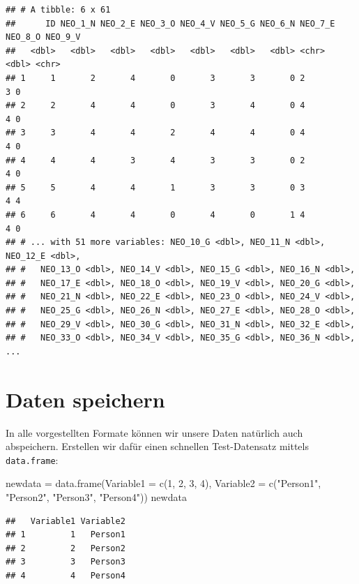 \documentclass[
]{book}
\newenvironment{Shaded}{\begin{snugshade}}{\end{snugshade}}
\newcommand{\AttributeTok}[1]{\textcolor[rgb]{0.77,0.63,0.00}{#1}}
\newcommand{\DecValTok}[1]{\textcolor[rgb]{0.00,0.00,0.81}{#1}}
\newcommand{\FunctionTok}[1]{\textcolor[rgb]{0.00,0.00,0.00}{#1}}
\newcommand{\NormalTok}[1]{#1}
\newcommand{\OtherTok}[1]{\textcolor[rgb]{0.56,0.35,0.01}{#1}}
\newcommand{\StringTok}[1]{\textcolor[rgb]{0.31,0.60,0.02}{#1}}
\begin{document}
\begin{verbatim}
## # A tibble: 6 x 61
##      ID NEO_1_N NEO_2_E NEO_3_O NEO_4_V NEO_5_G NEO_6_N NEO_7_E NEO_8_O NEO_9_V
##   <dbl>   <dbl>   <dbl>   <dbl>   <dbl>   <dbl>   <dbl> <chr>     <dbl> <chr>  
## 1     1       2       4       0       3       3       0 2             3 0      
## 2     2       4       4       0       3       4       0 4             4 0      
## 3     3       4       4       2       4       4       0 4             4 0      
## 4     4       4       3       4       3       3       0 2             4 0      
## 5     5       4       4       1       3       3       0 3             4 4      
## 6     6       4       4       0       4       0       1 4             4 0      
## # ... with 51 more variables: NEO_10_G <dbl>, NEO_11_N <dbl>, NEO_12_E <dbl>,
## #   NEO_13_O <dbl>, NEO_14_V <dbl>, NEO_15_G <dbl>, NEO_16_N <dbl>,
## #   NEO_17_E <dbl>, NEO_18_O <dbl>, NEO_19_V <dbl>, NEO_20_G <dbl>,
## #   NEO_21_N <dbl>, NEO_22_E <dbl>, NEO_23_O <dbl>, NEO_24_V <dbl>,
## #   NEO_25_G <dbl>, NEO_26_N <dbl>, NEO_27_E <dbl>, NEO_28_O <dbl>,
## #   NEO_29_V <dbl>, NEO_30_G <dbl>, NEO_31_N <dbl>, NEO_32_E <dbl>,
## #   NEO_33_O <dbl>, NEO_34_V <dbl>, NEO_35_G <dbl>, NEO_36_N <dbl>, ...
\end{verbatim}

\hypertarget{daten-speichern}{%
\section{Daten speichern}\label{daten-speichern}}

In alle vorgestellten Formate können wir unsere Daten natürlich auch abspeichern. Erstellen wir dafür einen schnellen Test-Datensatz mittels \texttt{data.frame}:

\begin{Shaded}
\begin{Highlighting}[]
\NormalTok{newdata }\OtherTok{=} \FunctionTok{data.frame}\NormalTok{(}\AttributeTok{Variable1 =} \FunctionTok{c}\NormalTok{(}\DecValTok{1}\NormalTok{, }\DecValTok{2}\NormalTok{, }\DecValTok{3}\NormalTok{, }\DecValTok{4}\NormalTok{),}
                     \AttributeTok{Variable2 =} \FunctionTok{c}\NormalTok{(}\StringTok{"Person1"}\NormalTok{, }\StringTok{"Person2"}\NormalTok{, }\StringTok{"Person3"}\NormalTok{, }\StringTok{"Person4"}\NormalTok{))}
\NormalTok{newdata}
\end{Highlighting}
\end{Shaded}

\begin{verbatim}
##   Variable1 Variable2
## 1         1   Person1
## 2         2   Person2
## 3         3   Person3
## 4         4   Person4
\end{verbatim}
\end{document}
